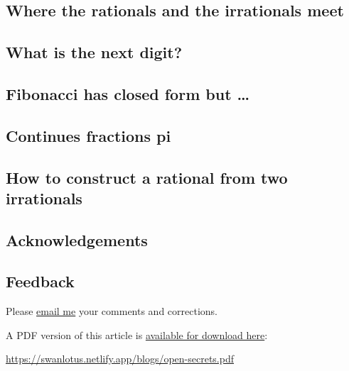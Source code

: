 \documentclass[
  a4paper,
]{article}
\begin{document}
\subsection{Where the rationals and the irrationals
meet}\label{where-the-rationals-and-the-irrationals-meet}

\subsection{What is the next digit?}\label{what-is-the-next-digit}

\subsection{Fibonacci has closed form but
\ldots{}}\label{fibonacci-has-closed-form-but}

\subsection{Continues fractions pi}\label{continues-fractions-pi}

\subsection{How to construct a rational from two
irrationals}\label{how-to-construct-a-rational-from-two-irrationals}

\subsection{Acknowledgements}\label{acknowledgements}

\subsection{Feedback}\label{feedback}

Please \href{mailto:feedback.swanlotus@gmail.com}{email me} your
comments and corrections.

\noindent A PDF version of this article is
\href{./open-secrets.pdf}{available for download here}:

\begin{small}

\begin{sffamily}

\url{https://swanlotus.netlify.app/blogs/open-secrets.pdf}

\end{sffamily}

\end{small}
\end{document}
